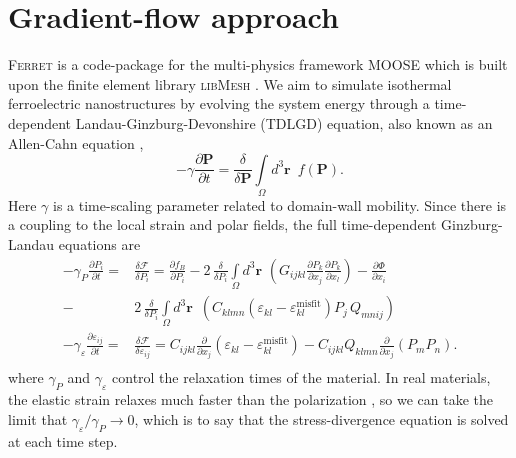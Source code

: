 \documentclass[16pt]{article} %
\begin{document}
\section{Gradient-flow approach}
%
%
\textsc{Ferret} is a code-package \cite{FerretLink} for the multi-physics framework MOOSE \cite{Gaston2009} which is built upon the finite element library \textsc{libMesh} \cite{Kirk2006}.
%
We aim to simulate isothermal ferroelectric nanostructures by evolving \cite{Su2007} the system energy through a time-dependent Landau-Ginzburg-Devonshire (TDLGD) equation, also known as an Allen-Cahn equation \cite{Tonks2012},
%
\begin{equation}\tag{10}
- \gamma \frac{\partial \textbf{P}}{\partial t} =  \frac{\delta}{\delta \textbf{P}}\int\limits_\Omega d^3 \textbf{r} \,\,\,f\left(\textbf{P} \right).
\end{equation}
%
Here $\gamma$ is a time-scaling parameter related to domain-wall mobility.
%
Since there is a coupling to the local strain and polar fields, the full time-dependent Ginzburg-Landau equations are
%
\begin{align}\tag{11}\label{eqn:tdGLP}
-\gamma_P\frac{\partial P_i}{\partial t} = & \frac{\delta {\mathcal F}}{\delta P_i}
=\frac{\partial f_B}{\partial P_i}-2 \, \frac{\delta}{\delta P_i} \int\limits_\Omega d^3 \textbf{r} \,\, \left(G_{ijkl}\frac{\partial P_k}{\partial x_j}\frac{\partial P_k}{\partial x_l}\right) - \frac{\partial \Phi}{\partial x_i}\nonumber\\
-& 2\, \frac{\delta}{\delta P_i} \int\limits_\Omega d^3 \textbf{r} \,\, \, \left(C_{klmn}\left(\varepsilon_{kl}-\varepsilon_{kl}^\mathrm{misfit}\right)P_j \, Q_{mnij} \right)\\
-\gamma_\varepsilon\frac{\partial\varepsilon_{ij}}{\partial t}  = &
\frac{\delta {\mathcal F}}{\delta\varepsilon_{ij}}=
C_{ijkl}\frac{\partial}{\partial x_j}\left(\varepsilon_{kl}-\varepsilon_{kl}^\mathrm{misfit}\right)
-C_{ijkl}Q_{klmn}\frac{\partial}{\partial x_j}\left(P_mP_n\right).\nonumber\\
\end{align}
%
where $\gamma_P$ and $\gamma_\varepsilon$ control the relaxation times of the material. In real materials, the elastic strain relaxes much faster than the polarization \cite{Dawber2005, Nelson2011}, so we can take the limit that $\gamma_\varepsilon / \gamma_P \to 0$, which is to say that the stress-divergence equation is solved at each time step.
\end{document}

